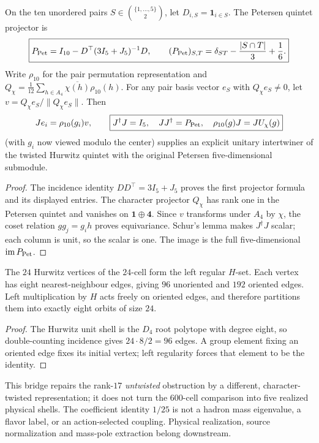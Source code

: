 \documentclass[11pt]{article}
\begin{document}
\begin{proposition}
\label{p1:prop:v344-petersen-quintet-intertwiner}
On the ten unordered pairs $S\in\binom{\{1,\dots,5\}}2$, let
$D_{i,S}=\mathbf1_{i\in S}$.  The Petersen quintet projector is
\[
 \boxed{P_{\rm Pet}=I_{10}-D^\top(3I_5+J_5)^{-1}D,\qquad
 (P_{\rm Pet})_{S,T}=\delta_{ST}-\frac{|S\cap T|}{3}+\frac16.}
\]
Write $\rho_{10}$ for the pair permutation representation and
$Q_\chi=\tfrac1{12}\sum_{h\in A_4}\overline{\chi(h)}\rho_{10}(h)$.
For any pair basis vector $e_S$ with $Q_\chi e_S\ne0$, let
$v=Q_\chi e_S/\|Q_\chi e_S\|$.  Then
\[
 J e_i=\rho_{10}(g_i)v,\qquad
 \boxed{J^\dagger J=I_5,\quad JJ^\dagger=P_{\rm Pet},\quad
 \rho_{10}(g)J=J U_\chi(g)}
\]
(with $g_i$ now viewed modulo the center) supplies an explicit
unitary intertwiner of the twisted Hurwitz quintet with the original
Petersen five-dimensional submodule.
\end{proposition}
\begin{proof}
The incidence identity $DD^\top=3I_5+J_5$ proves the first
projector formula and its displayed entries.  The character
projector $Q_\chi$ has rank one in the Petersen quintet and
vanishes on $\mathbf1\oplus\mathbf4$.  Since $v$ transforms
under $A_4$ by $\chi$, the coset relation
$gg_j=g_i h$ proves equivariance.  Schur's lemma makes
$J^\dagger J$ scalar; each column is unit, so the scalar is one.
The image is the full five-dimensional $\operatorname{im}P_{\rm Pet}$.
\end{proof}

\begin{proposition}
\label{p1:prop:v344-hurwitz-edge-eight-orbits}
The $24$ Hurwitz vertices of the $24$-cell form the left regular
$H$-set.  Each vertex has eight nearest-neighbour edges, giving
$96$ unoriented and $192$ oriented edges.  Left multiplication by
$H$ acts freely on oriented edges, and therefore partitions them
into exactly eight orbits of size $24$.
\end{proposition}
\begin{proof}
The Hurwitz unit shell is the $D_4$ root polytope with degree eight,
so double-counting incidence gives $24\cdot8/2=96$ edges.
A group element fixing an oriented edge fixes its initial vertex;
left regularity forces that element to be the identity.
\end{proof}

\begin{remark}
\label{p1:rem:v344-twisted-physical-scope}
This bridge repairs the rank-$17$ \emph{untwisted} obstruction by a
different, character-twisted representation; it does not turn the
$600$-cell comparison into five realized physical shells.  The
coefficient identity $1/25$ is not a hadron mass eigenvalue, a
flavor label, or an action-selected coupling.  Physical realization,
source normalization and mass-pole extraction belong downstream.
\end{remark}
\end{document}
